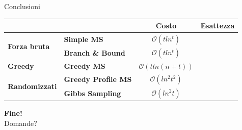 	\begin{frame}{Conclusioni}
		\renewcommand{\arraystretch}{2.3}
		\begin{center}
			\begin{tabular}{ll|c|c|}
				&  & Costo & Esattezza\\
				\hline
				\multirow{2}{*}{\textbf{Forza bruta}} & \textbf{Simple MS} & $\mathcal{O}(tln^t)$ & {\Large \color{darkgreen} \checkmark}\\
				\cline{2-4}
				& \textbf{Branch \& Bound} & $\mathcal{O}(tln^t)$ & {\Large \color{darkgreen} \checkmark}\\
				\hline
				\textbf{Greedy} & \textbf{Greedy MS} & $\mathcal{O}(tln(n+t))$ & \\
				\hline
				\multirow{2}{*}{\textbf{Randomizzati}} & \textbf{Greedy Profile MS} & $\mathcal{O}(ln^2t^2)$ & \\
				\cline{2-4}
				& \textbf{Gibbs Sampling} & $\mathcal{O}(ln^2t)$ & \\
				\hline
			\end{tabular}
		\end{center}
	\end{frame}
	
	\begin{frame}
		\begin{center}
			\textbf{\Huge Fine!}\\[1cm]
			\pause
			{\huge Domande?}
		\end{center}
	\end{frame}

